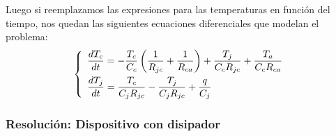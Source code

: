 Luego si reemplazamos las expresiones para las temperaturas en función del tiempo, nos quedan las siguientes ecuaciones diferenciales que modelan el problema:
\begin{equation}
\medskip
\label{eq:diferenciales}
   \left\{
      \begin{array}{ll}
         \dfrac{dT_{c}}{dt}=-\dfrac{T_{c}}{C_{c}}\left(\dfrac{1}{R_{jc}}+\dfrac{1}{R_{ca}}\right)+\dfrac{T_{j}}{C_{c}R_{jc}}+\dfrac{T_{a}}{C_{c}R_{ca}}\\[10pt] %
         \dfrac{dT_{j}}{dt}=\dfrac{T_{c}}{C_{j}R_{jc}}-\dfrac{T_{j}}{C_{j}R_{jc}}+\dfrac{q}{C_{j}}
      \end{array}
   \right.
\end{equation}
\subsubsection{Resolución: Dispositivo con disipador}


